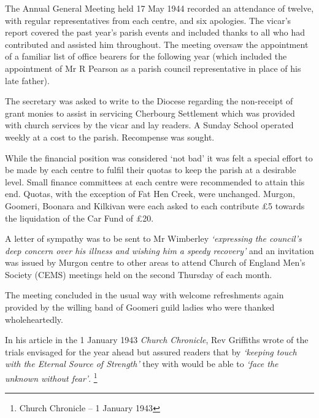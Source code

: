 The Annual General Meeting held 17 May 1944 recorded an attendance of twelve, with regular representatives from each centre, and six apologies. The vicar's report covered the past year's parish events and included thanks to all who had contributed and assisted him throughout. The meeting oversaw the appointment of a familiar list of office bearers for the following year (which included the appointment of Mr R Pearson as a parish council representative in place of his late father).



The secretary was asked to write to the Diocese regarding the non-receipt of grant monies to assist in servicing Cherbourg Settlement which was provided with church services by the vicar and lay readers. A Sunday School operated weekly at a cost to the parish. Recompense was sought.



While the financial position was considered `not bad' it was felt a special effort to be made by each centre to fulfil their quotas to keep the parish at a desirable level. Small finance committees at each centre were recommended to attain this end. Quotas, with the exception of Fat Hen Creek, were unchanged. Murgon, Goomeri, Boonara and Kilkivan were each asked to each contribute \pounds5 towards the liquidation of the Car Fund of \pounds20.



A letter of sympathy was to be sent to Mr Wimberley \emph{`expressing the council's deep concern over his illness and wishing him a speedy recovery'} and an invitation was issued by Murgon centre to other areas to attend Church of England Men's Society (CEMS) meetings held on the second Thursday of each month.



The meeting concluded in the usual way with welcome refreshments again provided by the willing band of Goomeri guild ladies who were thanked wholeheartedly.



In his article in the 1 January 1943 \emph{Church Chronicle}, Rev Griffiths wrote of the trials envisaged for the year ahead but assured readers that by \emph{`keeping touch with the Eternal Source of Strength'} they with would be able to \emph{`face the unknown without fear'}. \footnote{Church Chronicle -- 1 January 1943}


